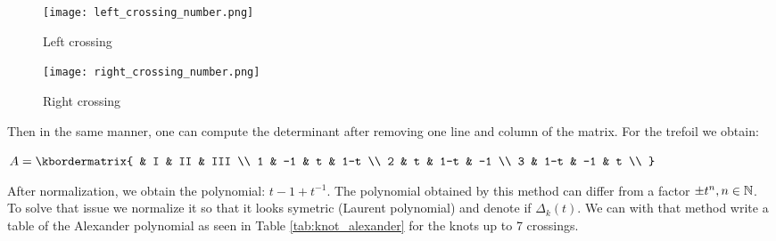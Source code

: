 \documentclass[12pt, a4paper]{article}
\begin{document}
\begin{figure}[H]
  \begin{minipage}[c]{.50\textwidth}
  \centering
  \texttt{[image: left\_crossing\_number.png]}    
  \caption{Left crossing}
  \end{minipage}
  \hfill
  \begin{minipage}[c]{.50\textwidth}
  \centering
  \texttt{[image: right\_crossing\_number.png]}    
  \caption{Right crossing}
  \end{minipage}
  \label{fig:oriented_knot_alexander} 
\end{figure}

Then in the same manner, one can compute the determinant after removing one line and column of the matrix. For the trefoil we obtain:\\

\begin{center}
$
  A = \kbordermatrix{
    & I & II & III \\
    1 & -1 & t & 1-t  \\
    2 & t & 1-t & -1  \\
    3 & 1-t & -1 & t  \\
  }
$
\end{center}

After normalization, we obtain the polynomial: $t - 1 + t^{-1}$. The polynomial obtained by this method can differ from a factor $\pm t^n, n \in \mathbb{N}$. To solve that issue we normalize it so that it looks symetric (Laurent polynomial) and denote if $\Delta_k(t)$. We can with that method write a table of the Alexander polynomial as seen in Table \ref{tab:knot_alexander} for the knots up to 7 crossings.
\end{document}
